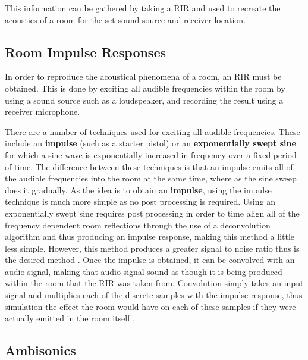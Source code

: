 \documentclass[../../main.tex]{subfiles}
\begin{document}
		This information can be gathered by taking a \ac{RIR} and used to recreate the acoustics of a room for the set sound source and receiver location.

	\subsection{Room Impulse Responses}

		In order to reproduce the acoustical phenomena of a room, an \ac{RIR} must be obtained. This is done by exciting all audible frequencies within the room by using a sound source such as a loudspeaker, and recording the result using a receiver microphone.

		There are a number of techniques used for exciting all audible frequencies. These include an \textbf{impulse} (such as a starter pistol) or an \textbf{exponentially swept sine} for which a sine wave is exponentially increased in frequency over a fixed period of time. The difference between these techniques is that an impulse emits all of the audible frequencies into the room at the same time, where as the sine sweep does it gradually. As the idea is to obtain an \textbf{impulse}, using the impulse technique is much more simple as no post processing is required. Using an exponentially swept sine requires post processing in order to time align all of the frequency dependent room reflections through the use of a deconvolution algorithm and thus producing an impulse response, making this method a little less simple. However, this method produces a greater signal to noise ratio thus is the desired method \cite{Stan2002}. Once the impulse is obtained, it can be convolved with an audio signal, making that audio signal sound as though it is being produced within the room that the \ac{RIR} was taken from. Convolution simply takes an input signal and multiplies each of the discrete samples with the impulse response, thus simulation the effect the room would have on each of these samples if they were actually emitted in the room itself \cite{Smith2003}.

	\subsection{Ambisonics}


\end{document}

